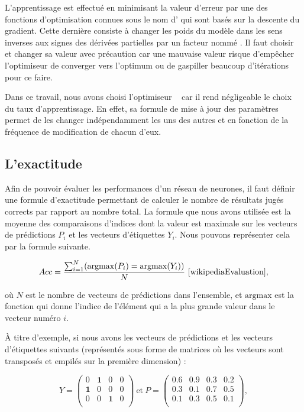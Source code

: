 L’apprentissage est effectué en minimisant la valeur d'erreur par une des fonctions
d'optimisation connues sous le nom d' qui sont basés sur la descente
du gradient. Cette dernière consiste à changer les poids du modèle dans les sens inverses
aux signes des dérivées partielles par un facteur nommé .
Il faut choisir et changer sa valeur avec précaution car une mauvaise valeur
risque d'empêcher l'optimiseur de converger vers l'optimum ou de gaspiller beaucoup
d'itérations pour ce faire.~\cite{DBLP:journals/corr/Ruder16}

Dans ce travail, nous avons choisi l'optimiseur ~\cite{DBLP:journals/corr/abs-1212-5701}
car il rend négligeable le choix du taux d'apprentissage. En effet, sa
formule de mise à jour des paramètres permet de les changer indépendamment
les uns des autres et en fonction de la fréquence de modification de chacun d'eux.~\cite{DBLP:journals/corr/Ruder16}

\subsection{L'exactitude}

Afin de pouvoir évaluer les performances d'un réseau de neurones, il faut définir
une formule d'exactitude permettant de calculer le nombre de résultats jugés
corrects par rapport au nombre total. La formule que nous avons utilisée est
la moyenne des comparaisons d'indices dont la valeur est maximale sur les
vecteurs de prédictions $P_i$ et les vecteurs d'étiquettes $Y_i$. Nous pouvons représenter
cela par la formule suivante.

$$
Acc = \frac{\sum_{i=1}^N(\mathrm{argmax}(P_i) = \mathrm{argmax}(Y_i))}{N}~\cite{wikipediaEvaluation},
$$

où $N$ est le nombre de vecteurs de prédictions dans l'ensemble, et
$\mathrm{argmax}$ est la fonction qui donne l'indice de l'élément qui a la plus grande
valeur dans le vecteur numéro $i$.

\`A titre d'exemple, si nous avons les vecteurs de prédictions et les vecteurs
d'étiquettes suivants (représentés sous forme de matrices où les vecteurs sont transposés
et empilés sur la première dimension) :

$$
Y =
\begin{pmatrix}
  0 & \mathbf{1} & 0 & 0\\
  \mathbf{1} & 0 & 0 & 0\\
  0 & 0 & \mathbf{1} & 0\\
\end{pmatrix}
~
\mathrm{et}
~
P =
\begin{pmatrix}
  0.6 & \mathbf{0.9} & 0.3 & 0.2\\
  0.3 & 0.1 & \mathbf{0.7} & 0.5\\
  0.1 & 0.3 & \mathbf{0.5} & 0.1\\
\end{pmatrix},
$$

